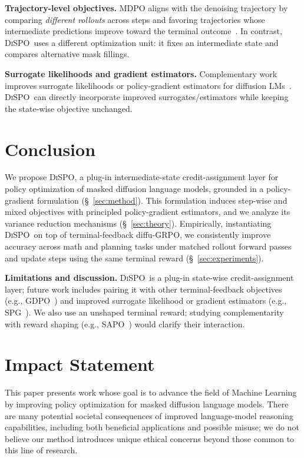\documentclass{article}
\newcommand{\method}{{\textsc{DiSPO}}}
\theoremstyle{plain}
\theoremstyle{definition}
\theoremstyle{remark}
\begin{document}
\textbf{Trajectory-level objectives.}
MDPO aligns with the denoising trajectory by comparing \emph{different rollouts} across steps and favoring trajectories whose intermediate predictions improve toward the terminal outcome~\citep{mdpo}.
In contrast, \method\ uses a different optimization unit: it fixes an intermediate state and compares alternative mask fillings.


\textbf{Surrogate likelihoods and gradient estimators.}
Complementary work improves surrogate likelihoods or policy-gradient estimators for diffusion LMs~\citep{spg,sepo,gdpo,d2}.
\method\ can directly incorporate improved surrogates/estimators while keeping the state-wise objective unchanged.




\section{Conclusion}\label{sec:conclusion}
We propose \method, a plug-in intermediate-state credit-assignment layer for policy optimization of masked diffusion language models, grounded in a policy-gradient formulation (\S~\ref{sec:method}).
This formulation induces step-wise and mixed objectives with principled policy-gradient estimators, and we analyze its variance reduction mechanisms (\S~\ref{sec:theory}).
Empirically, instantiating \method\ on top of terminal-feedback diffu-GRPO, we consistently improve accuracy across math and planning tasks under matched rollout forward passes and update steps using the same terminal reward (\S~\ref{sec:experiments}).

\textbf{Limitations and discussion.}
\method\ is a plug-in state-wise credit-assignment layer; future work includes pairing it with other terminal-feedback objectives (e.g., GDPO~\citep{gdpo}) and improved surrogate likelihood or gradient estimators (e.g., SPG~\citep{spg}).
We also use an unshaped terminal reward; studying complementarity with reward shaping (e.g., SAPO~\citep{sapo}) would clarify their interaction.



\clearpage
\section*{Impact Statement}
This paper presents work whose goal is to advance the field of Machine Learning by improving policy optimization for masked diffusion language models.
There are many potential societal consequences of improved language-model reasoning capabilities, including both beneficial applications and possible misuse; we do not believe our method introduces unique ethical concerns beyond those common to this line of research.
\end{document}
